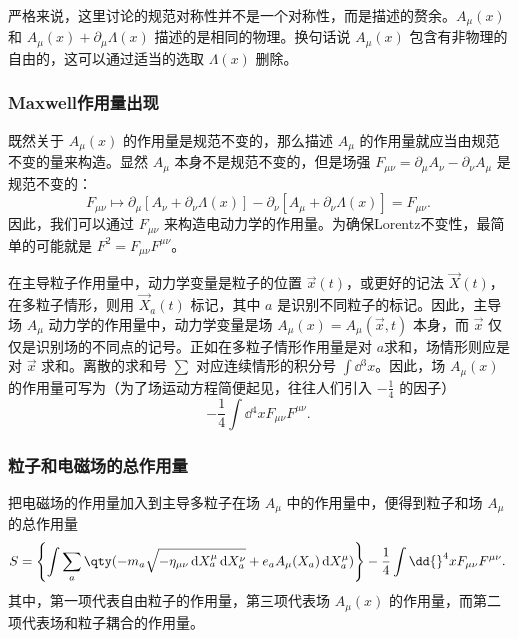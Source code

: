 严格来说，这里讨论的规范对称性并不是一个对称性，而是描述的赘余。$A_\mu(x)$ 和 $A_\mu(x)+\partial_\mu\Lambda(x)$ 描述的是相同的物理。换句话说 $A_\mu(x)$ 包含有非物理的自由的，这可以通过适当的选取 $\Lambda(x)$ 删除。

\subsubsection{Maxwell作用量出现}

既然关于 $A_\mu(x)$ 的作用量是规范不变的，那么描述 $A_\mu$ 的作用量就应当由规范不变的量来构造。显然 $A_\mu$ 本身不是规范不变的，但是场强 $F_{\mu\nu}=\partial_\mu A_\nu-\partial_\nu A_\mu$ 是规范不变的：
\begin{equation}
F_{\mu\nu}\mapsto \partial_\mu[ A_\nu+\partial_\nu\Lambda(x)]-\partial_\nu[ A_\mu+\partial_\nu\Lambda(x)]=F_{\mu\nu}.~
\end{equation}
因此，我们可以通过 $F_{\mu\nu}$ 来构造电动力学的作用量。为确保Lorentz不变性，最简单的可能就是 $F^2=F_{\mu\nu}F^{\mu\nu}$。

在主导粒子作用量中，动力学变量是粒子的位置 $\vec x(t)$，或更好的记法 $\vec X(t)$，在多粒子情形，则用 $\vec X_a(t)$ 标记，其中 $a$ 是识别不同粒子的标记。因此，主导场 $A_\mu$ 动力学的作用量中，动力学变量是场 $A_\mu(x)=A_\mu(\vec x,t)$ 本身，而 $\vec x$ 仅仅是识别场的不同点的记号。正如在多粒子情形作用量是对 $a$求和，场情形则应是对 $\vec x$ 求和。离散的求和号 $\sum$ 对应连续情形的积分号 $\int\dd{}^3 x$。因此，场 $A_\mu(x)$ 的作用量可写为（为了场运动方程简便起见，往往人们引入 $-\frac{1}{4}$ 的因子）
\begin{equation}
-\frac{1}{4}\int\dd{}^4 x F_{\mu\nu}F^{\mu\nu}.~
\end{equation}

\subsubsection{粒子和电磁场的总作用量}

把电磁场的作用量加入到主导多粒子在场 $A_\mu$ 中的作用量中，便得到粒子和场 $A_\mu$ 的总作用量
\begin{equation}
 S=\left\{\int\sum_a\qty(-m_a\sqrt{-\eta_{\mu\nu} \,\mathrm{d} X_a ^\mu \,\mathrm{d}X_a ^\nu}+e_aA_\mu(X_a) \,\mathrm{d}X_a ^\mu) \right\}-\frac{1}{4}\int\dd{}^4 x F_{\mu\nu}F^{\mu\nu}.~
\end{equation}
其中，第一项代表自由粒子的作用量，第三项代表场 $A_\mu(x)$ 的作用量，而第二项代表场和粒子耦合的作用量。









